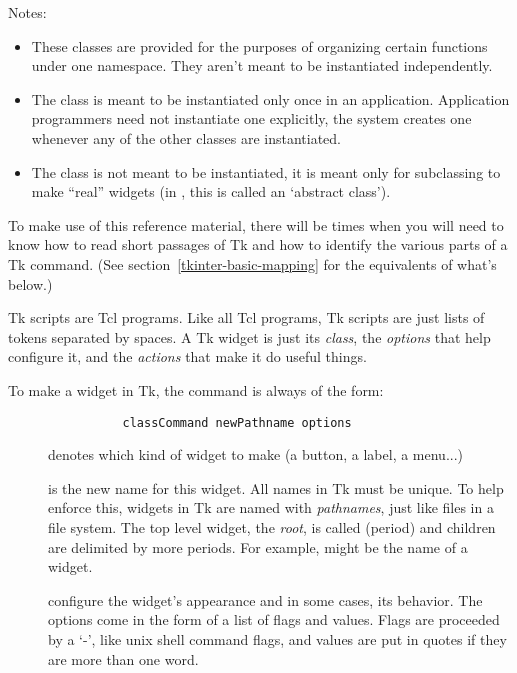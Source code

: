 Notes:
\begin{itemize}
\item   These classes are provided for the purposes of
organizing certain functions under one namespace. They aren't meant to
be instantiated independently.

\item    The  class is meant to be instantiated only once in
an application. Application programmers need not instantiate one
explicitly, the system creates one whenever any of the other classes
are instantiated.

\item    The  class is not meant to be instantiated, it
is meant only for subclassing to make ``real'' widgets (in \Cpp, this
is called an `abstract class').
\end{itemize}

To make use of this reference material, there will be times when you
will need to know how to read short passages of Tk and how to identify
the various parts of a Tk command.  
(See section~\ref{tkinter-basic-mapping} for the
 equivalents of what's below.)

Tk scripts are Tcl programs.  Like all Tcl programs, Tk scripts are
just lists of tokens separated by spaces.  A Tk widget is just its
\emph{class}, the \emph{options} that help configure it, and the
\emph{actions} that make it do useful things. 

To make a widget in Tk, the command is always of the form: 

\begin{verbatim}
                classCommand newPathname options
\end{verbatim}

\begin{description}
\item[]
denotes which kind of widget to make (a button, a label, a menu...)

\item[]
is the new name for this widget.  All names in Tk must be unique.  To
help enforce this, widgets in Tk are named with \emph{pathnames}, just
like files in a file system.  The top level widget, the \emph{root},
is called  (period) and children are delimited by more
periods.  For example,  might be
the name of a widget.

\item[ ]
configure the widget's appearance and in some cases, its
behavior.  The options come in the form of a list of flags and values.
Flags are proceeded by a `-', like unix shell command flags, and
values are put in quotes if they are more than one word.
\end{description}

